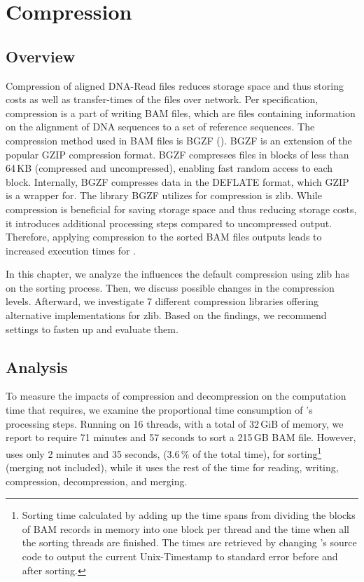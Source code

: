 \section{Compression}\label{compression}

\subsection{Overview}
Compression of aligned DNA-Read files reduces storage space and thus storing costs as well as transfer-times of the files over network. Per specification, compression is a part of writing BAM files, which are files containing information on the alignment of DNA sequences to a set of reference sequences. The compression method used in BAM files is BGZF (). BGZF is an extension of the popular GZIP compression format. BGZF compresses files in blocks of less than 64\,KB (compressed and uncompressed), enabling fast random access to each block. Internally, BGZF compresses data in the DEFLATE format, which GZIP is a wrapper for. The library BGZF utilizes for compression is zlib.
While compression is beneficial for saving storage space and thus reducing storage costs, it introduces additional processing steps compared to uncompressed output. Therefore, applying compression to the sorted BAM files \sort outputs leads to increased execution times for \sort.

In this chapter, we analyze the influences the default compression using zlib has on the sorting process. Then, we discuss possible changes in the compression levels. Afterward, we investigate 7 different compression libraries offering alternative implementations for zlib. Based on the findings, we recommend settings to fasten up \sort and evaluate them.

\subsection{Analysis}
To measure the impacts of compression and decompression on the computation time that \sort requires, we examine the proportional time consumption of \sort's processing steps. 
Running on 16 threads, with a total of 32\,GiB of memory, we report \sort to require 71 minutes and 57 seconds to sort a 215\,GB BAM file. However, \sort uses only 2 minutes and 35 seconds, (3.6\,\% of the total time), for sorting\footnote{Sorting time calculated by adding up the time spans from dividing the blocks of BAM records in memory into one block per thread and the time when all the sorting threads are finished. The times are retrieved by changing \sort's source code to output the current Unix-Timestamp to standard error before and after sorting.} (merging not included), while it uses the rest of the time for reading, writing, compression, decompression, and merging.

